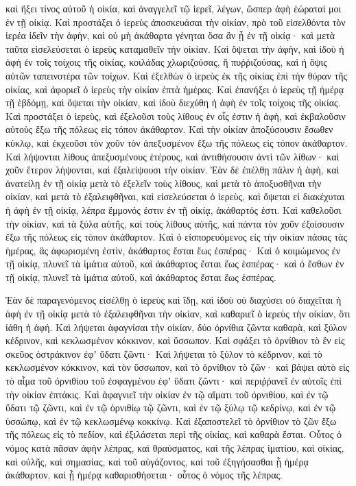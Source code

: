 {καὶ ἥξει τίνος αὐτοῦ ἡ οἰκία, καὶ ἀναγγελεῖ τῷ ἱερεῖ, λέγων, ὥσπερ ἁφὴ ἑώραταί μοι ἐν τῇ οἰκίᾳ.
Καὶ προστάξει ὁ ἱερεὺς ἀποσκευάσαι τὴν οἰκίαν, πρὸ τοῦ εἰσελθόντα τὸν ἱερέα ἰδεῖν τὴν ἁφὴν, καὶ οὐ μὴ ἀκάθαρτα γένηται ὅσα ἂν ᾖ ἐν τῇ οἰκίᾳ· καὶ μετὰ ταῦτα εἰσελεύσεται ὁ ἱερεὺς καταμαθεῖν τὴν οἰκίαν.
Καὶ ὄψεται τὴν ἁφὴν, καὶ ἰδοὺ ἡ ἁφὴ ἐν τοῖς τοίχοις τῆς οἰκίας, κοιλάδας χλωριζούσας, ἢ πυῤῥιζούσας, καὶ ἡ ὄψις αὐτῶν ταπεινοτέρα τῶν τοίχων.
Καὶ ἐξελθὼν ὁ ἱερεὺς ἐκ τῆς οἰκίας ἐπὶ τὴν θύραν τῆς οἰκίας, καὶ ἀφοριεῖ ὁ ἱερεὺς τὴν οἰκίαν ἑπτὰ ἡμέρας.
Καὶ ἐπανήξει ὁ ἱερεὺς τῇ ἡμέρᾳ τῇ ἑβδόμῃ, καὶ ὄψεται τὴν οἰκίαν, καὶ ἰδοὺ διεχύθη ἡ ἁφὴ ἐν τοῖς τοίχοις τῆς οἰκίας.
Καὶ προστάξει ὁ ἱερεὺς, καὶ ἐξελοῦσι τοὺς λίθους ἐν οἷς ἐστιν ἡ ἁφὴ, καὶ ἐκβαλοῦσιν αὐτοὺς ἔξω τῆς πόλεως εἰς τόπον ἀκάθαρτον.
Καὶ τὴν οἰκίαν ἀποξύσουσιν ἔσωθεν κύκλῳ, καὶ ἐκχεοῦσι τὸν χοῦν τὸν ἀπεξυσμένον ἔξω τῆς πόλεως εἰς τόπον ἀκάθαρτον.
Καὶ λήψονται λίθους ἀπεξυσμένους ἑτέρους, καὶ ἀντιθήσουσιν ἀντὶ τῶν λίθων· καὶ χοῦν ἕτερον λήψονται, καὶ ἐξαλείψουσι τὴν οἰκίαν.
Ἐὰν δὲ ἐπέλθῃ πάλιν ἡ ἁφὴ, καὶ ἀνατείλῃ ἐν τῇ οἰκίᾳ μετὰ τὸ ἐξελεῖν τοὺς λίθους, καὶ μετὰ τὸ ἀποξυσθῆναι τὴν οἰκίαν, καὶ μετὰ τὸ ἐξαλειφθῆναι,
καὶ εἰσελεύσεται ὁ ἱερεὺς, καὶ ὄψεται εἰ διακέχυται ἡ ἁφὴ ἐν τῇ οἰκίᾳ, λέπρα ἔμμονός ἐστιν ἐν τῇ οἰκίᾳ, ἀκάθαρτός ἐστι.
Καὶ καθελοῦσι τὴν οἰκίαν, καὶ τὰ ξύλα αὐτῆς, καὶ τοὺς λίθους αὐτῆς, καὶ πάντα τὸν χοῦν ἐξοίσουσιν ἔξω τῆς πόλεως εἰς τόπον ἀκάθαρτον.
Καὶ ὁ εἰσπορευόμενος εἰς τὴν οἰκίαν πάσας τὰς ἡμέρας, ἃς ἀφωρισμένη ἐστὶν, ἀκάθαρτος ἔσται ἕως ἑσπέρας·
Καὶ ὁ κοιμώμενος ἐν τῇ οἰκίᾳ, πλυνεῖ τὰ ἱμάτια αὐτοῦ, καὶ ἀκάθαρτος ἔσται ἕως ἑσπέρας· καὶ ὁ ἔσθων ἐν τῇ οἰκίᾳ, πλυνεῖ τὰ ἱμάτια αὐτοῦ, καὶ ἀκάθαρτος ἔσται ἕως ἑσπέρας.
\par }{\PP {}Ἐὰν δὲ παραγενόμενος εἰσέλθῃ ὁ ἱερεὺς καὶ ἴδῃ, καὶ ἰδοὺ οὐ διαχύσει οὐ διαχεῖται ἡ ἁφὴ ἐν τῇ οἰκίᾳ μετὰ τὸ ἐξαλειφθῆναι τὴν οἰκίαν, καὶ καθαριεῖ ὁ ἱερεὺς τὴν οἰκίαν, ὅτι ἰάθη ἡ ἁφή.
Καὶ λήψεται ἀφαγνίσαι τὴν οἰκίαν, δύο ὀρνίθια ζῶντα καθαρὰ, καὶ ξύλον κέδρινον, καὶ κεκλωσμένον κόκκινον, καὶ ὕσσωπον.
Καὶ σφάξει τὸ ὀρνίθιον τὸ ἓν εἰς σκεῦος ὀστράκινον ἐφʼ ὕδατι ζῶντι·
Καὶ λήψεται τὸ ξύλον τὸ κέδρινον, καὶ τὸ κεκλωσμένον κόκκινον, καὶ τὸν ὕσσωπον, καὶ τὸ ὀρνίθιον τὸ ζῶν· καὶ βάψει αὐτὸ εἰς τὸ αἷμα τοῦ ὀρνιθίου τοῦ ἐσφαγμένου ἐφʼ ὕδατι ζῶντι· καὶ περιῤῥανεῖ ἐν αὐτοῖς ἐπὶ τὴν οἰκίαν ἑπτάκις.
Καὶ ἀφαγνιεῖ τὴν οἰκίαν ἐν τῷ αἵματι τοῦ ὀρνιθίου, καὶ ἐν τῷ ὕδατι τῷ ζῶντι, καὶ ἐν τῷ ὀρνιθίῳ τῷ ζῶντι, καὶ ἐν τῷ ξύλῳ τῷ κεδρίνῳ, καὶ ἐν τῷ ὑσσώπῳ, καὶ ἐν τῷ κεκλωσμένῳ κοκκίνῳ.
Καὶ ἐξαποστελεῖ τὸ ὀρνίθιον τὸ ζῶν ἔξω τῆς πόλεως εἰς τὸ πεδίον, καὶ ἐξιλάσεται περὶ τῆς οἰκίας, καὶ καθαρὰ ἔσται.
Οὗτος ὁ νόμος κατὰ πᾶσαν ἁφὴν λέπρας, καὶ θραύσματος,
καὶ τῆς λέπρας ἱματίου, καὶ οἰκίας,
καὶ οὐλῆς, καὶ σημασίας, καὶ τοῦ αὐγάζοντος,
καὶ τοῦ ἐξηγήσασθαι ᾗ ἡμέρᾳ ἀκάθαρτον, καὶ ᾗ ἡμέρᾳ καθαρισθήσεται· οὗτος ὁ νόμος τῆς λέπρας.

}
